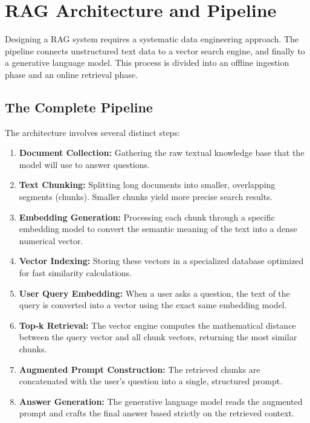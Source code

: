 \documentclass[11pt,a4paper]{article}
\begin{document}
\section{RAG Architecture and Pipeline}

Designing a RAG system requires a systematic data engineering approach. The pipeline connects unstructured text data to a vector search engine, and finally to a generative language model. This process is divided into an offline ingestion phase and an online retrieval phase.

\subsection{The Complete Pipeline}
The architecture involves several distinct steps:
\begin{enumerate}
    \item \textbf{Document Collection:} Gathering the raw textual knowledge base that the model will use to answer questions.
    \item \textbf{Text Chunking:} Splitting long documents into smaller, overlapping segments (chunks). Smaller chunks yield more precise search results.
    \item \textbf{Embedding Generation:} Processing each chunk through a specific embedding model to convert the semantic meaning of the text into a dense numerical vector.
    \item \textbf{Vector Indexing:} Storing these vectors in a specialized database optimized for fast similarity calculations.
    \item \textbf{User Query Embedding:} When a user asks a question, the text of the query is converted into a vector using the exact same embedding model.
    \item \textbf{Top-k Retrieval:} The vector engine computes the mathematical distance between the query vector and all chunk vectors, returning the most similar chunks.
    \item \textbf{Augmented Prompt Construction:} The retrieved chunks are concatenated with the user's question into a single, structured prompt.
    \item \textbf{Answer Generation:} The generative language model reads the augmented prompt and crafts the final answer based strictly on the retrieved context.
\end{enumerate}
\end{document}
